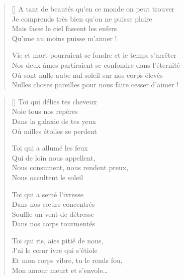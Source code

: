 \newpage

\settowidth{\versewidth}{Nulles choses pareilles pour nous faire cesser d'aimer !}
\begin{verse}[\versewidth]
A tant de beautés qu'en ce monde on peut trouver \\
Je comprends très bien qu'on ne puisse plaire \\
Mais fasse le ciel fassent les enfers \\
Qu'une au moins puisse m'aimer !

Vie et mort pourraient se fondre et le temps s'arrêter \\
Nos deux âmes partiraient se confondre dans l'éternité \\
Où sont nulle aube nul soleil sur nos corps élevés \\
Nulles choses pareilles pour nous faire cesser d'aimer !
\end{verse}

\newpage

\settowidth{\versewidth}{Et mon corps vibre, tu le rends fou,}
\begin{verse}[\versewidth]
Toi qui délies tes cheveux \\
Noie tous nos repères \\
Dans la galaxie de tes yeux \\
Où milles étoiles se perdent

Toi qui a allumé les feux \\
Qui de loin nous appellent, \\
Nous consument, nous rendent preux, \\
Nous occultent le soleil

Toi qui a semé l'ivresse \\
Dans nos cœurs concentrés \\
Souffle un vent de détresse \\
Dans nos corps tourmentés

Toi qui ris, aies pitié de nous, \\
J'ai le cœur ivre qui s'étiole \\
Et mon corps vibre, tu le rends fou, \\
Mon amour meurt et s'envole…
\end{verse}


